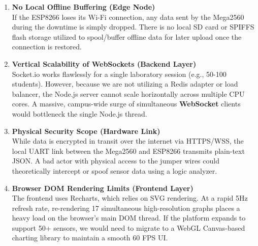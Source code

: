 \documentclass[12pt,a4paper]{article}
\newcommand{\keyword}[1]{\textcolor{keywordcolor}{\textbf{#1}}}
\newcommand{\Q}[1]{\textcolor{questioncolor}{\textbf{#1}}}
\begin{document}
\begin{enumerate}
    \item \Q{No Local Offline Buffering (Edge Node)} \\
    If the ESP8266 loses its Wi-Fi connection, any data sent by the Mega2560 during the downtime is simply dropped. There is no local SD card or SPIFFS flash storage utilized to spool/buffer offline data for later upload once the connection is restored.

    \item \Q{Vertical Scalability of \keyword{WebSocket}s (Backend Layer)} \\
    Socket.io works flawlessly for a single laboratory session (e.g., 50-100 students). However, because we are not utilizing a Redis adapter or load balancer, the Node.js server cannot scale horizontally across multiple CPU cores. A massive, campus-wide surge of simultaneous \keyword{WebSocket} clients would bottleneck the single Node.js thread.

    \item \Q{Physical Security Scope (Hardware Link)} \\
    While data is encrypted in transit over the internet via HTTPS/WSS, the local UART link between the Mega2560 and ESP8266 transmits plain-text JSON. A bad actor with physical access to the jumper wires could theoretically intercept or spoof sensor data using a logic analyzer.

    \item \Q{Browser DOM Rendering Limits (Frontend Layer)} \\
    The frontend uses Recharts, which relies on SVG rendering. At a rapid 5Hz refresh rate, re-rendering 17 simultaneous high-resolution graphs places a heavy load on the browser's main DOM thread. If the platform expands to support 50+ sensors, we would need to migrate to a WebGL Canvas-based charting library to maintain a smooth 60 FPS UI.
\end{enumerate}
\end{document}
